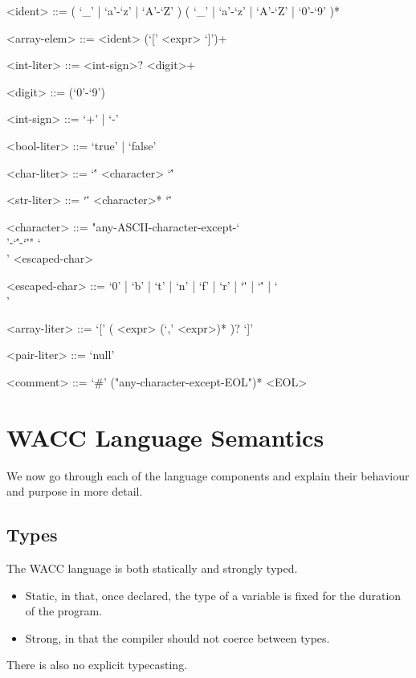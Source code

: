 \documentclass[a4paper]{article}
\theoremstyle{definition}
\begin{document}
\begin{grammar}
  <ident> ::= ( `\_' | `a'-`z' | `A'-`Z' ) ( `\_' | `a'-`z' | `A'-`Z' | `0'-`9' )*      
  
  <array-elem> ::= <ident> (`[' <expr> `]')+ 
  
  <int-liter> ::= <int-sign>? <digit>+ 

  <digit> ::= (`0'-`9')
  
  <int-sign> ::= `+' | `-'  
  
  <bool-liter> ::= `true' | `false'
  
  <char-liter> ::= `\'' <character> `\''  

  <str-liter> ::= `\"' <character>* `\"'  
  
  <character> ::= "any-ASCII-character-except-`\\'-`\''-`\"'" 
    \alt `\\' <escaped-char>   

  <escaped-char> ::= `0' | `b' | `t' | `n' | `f' | `r' | `\"' | `\'' | `\\'

  <array-liter> ::= `[' ( <expr> (`,' <expr>)* )? `]' 

  <pair-liter> ::= `null'
    
  <comment> ::= `#' ("any-character-except-EOL")* <EOL>  
\end{grammar}


\section{WACC Language Semantics}
We now go through each of the language components and explain their behaviour and purpose in more detail.

\subsection{Types}
The WACC language is both statically and strongly typed.
\begin{itemize}
  \item Static, in that, once declared, the type of a variable is fixed for the duration of the program. 
  \item Strong, in that the compiler should not coerce between types.
\end{itemize}
There is also no explicit typecasting.
\end{document}
